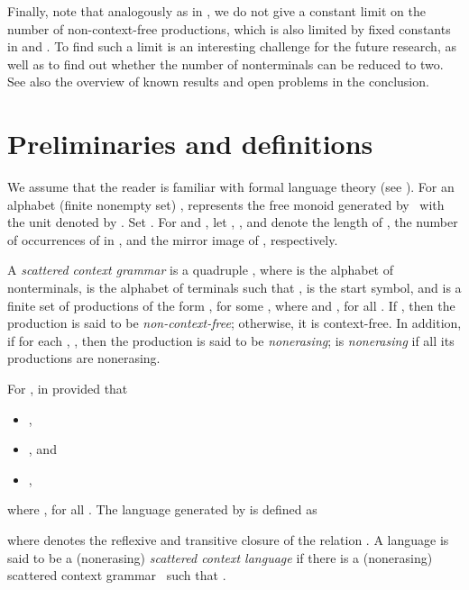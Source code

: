 \documentclass[copyright]{eptcs}
\begin{document}
  Finally, note that analogously as in \cite{Meduna00b}, we do not give a constant limit on the number of non-context-free productions, which is also limited by fixed constants in \cite{vaszil} and \cite{masopustTCS}. To find such a limit is an interesting challenge for the future research, as well as to find out whether the number of nonterminals can be reduced to two. See also the overview of known results and open problems in the conclusion.

\section{Preliminaries and definitions}
  We assume that the reader is familiar with formal language theory (see \cite{salomaa}).
  For an alphabet (finite nonempty set) ,  represents the free monoid generated 
  by~ with the unit denoted by . Set . For  and , let , , and  denote the length of , the number of occurrences of  in , and the mirror image of , respectively.

  A {\em scattered context grammar\/} is a quadruple , where  is the alphabet of nonterminals,  is the alphabet of terminals such that ,  is the start symbol, and  is a finite set of productions of the form , for some , where  and , for all . If , then the production is said to be {\em non\mbox{-}context-free}; otherwise, it is context-free. In addition, if for each , , then the production is said to be {\em nonerasing};  is {\em nonerasing\/} if all its productions are nonerasing.

  For ,  in  provided that
  \begin{itemize}
    \item ,
    \item , and
    \item ,
  \end{itemize}
  where , for all . The language generated by  is 
  defined as 
   
  where  denotes the reflexive and 
  transitive closure of the relation . A language  is said to be 
  a (nonerasing) {\em scattered context language} if there is a (nonerasing) scattered 
  context grammar~ such that .
\end{document}
